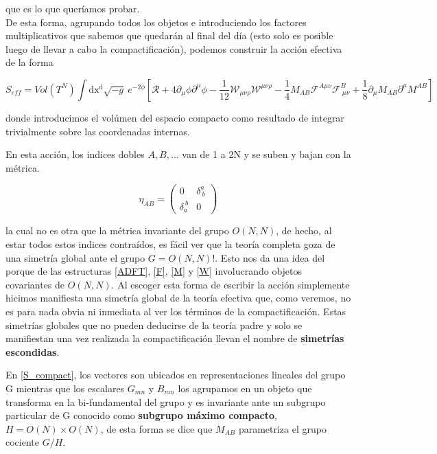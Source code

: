 \documentclass{article}
\numberwithin{equation}{section}
\begin{document}
que es lo que queríamos probar.\\


De esta forma, agrupando todos los objetos e introduciendo los factores multiplicativos que sabemos que quedarán al final del día (esto solo es posible luego de llevar a cabo la compactificación), podemos construir la acción efectiva de la forma


\begin{boxquation}
	\begin{equation}\label{S_compact}
	S_{eff}= Vol(T^N) \int\mathrm{dx^d} \sqrt{-g} \ e^{-2\phi}\left[ \mathcal{R} + 4 \partial_{\mu}\phi\partial^{\mu} \phi - \frac{1}{12} \mathcal{W}_{\mu \nu \rho} \mathcal{W}^{\mu \nu \rho} -\frac{1}{4} M_{A B} \mathcal{F}^{A \mu \nu} \mathcal{F}^B_{\ \mu \nu} + \frac{1}{8} \partial_{\mu} M_{A B} \partial^{\mu} M^{A B}\right] 
	\end{equation}
\end{boxquation}


donde introducimos el volúmen del espacio compacto como resultado de integrar trivialmente sobre las coordenadas internas.

En esta acción, los indices dobles $ A,B,... $ van de 1 a 2N y se suben y bajan con la métrica.

\begin{equation}\label{eta}
\eta_{A B} = \begin{pmatrix}
0 & \delta^a_{\ b}\\
\delta_a^{\ b} & 0
\end{pmatrix}
\end{equation}

la cual no es otra que la métrica invariante del grupo $ O(N,N) $, de hecho, al estar todos estos indices contraídos, es fácil ver que la teoría completa goza de una simetría global ante el grupo $ G= O(N,N) $!. Esto nos da una idea del porque de las estructuras \ref{ADFT}, \ref{F}, \ref{M} y \ref{W} involucrando objetos covariantes de $ O(N,N) $. Al escoger esta forma de escribir la acción simplemente hicimos manifiesta una simetría global de la teoría efectiva que, como veremos, no es para nada obvia ni inmediata al ver los términos de la compactificación. Estas simetrías globales que no pueden deducirse de la teoría padre y solo se manifiestan una vez realizada la compactificación llevan el nombre de \textbf{simetrías escondidas}.

En \ref{S_compact}, los vectores son ubicados en representaciones lineales del grupo G mientras que los escalares $ G_{m n} $ y $ B_{m n} $ los agrupamos en un objeto que transforma en la bi-fundamental del grupo y es invariante ante un subgrupo particular de G conocido como \textbf{subgrupo máximo compacto}, $ H= O(N) \times O(N) $, de esta forma se dice que $ M_{A B} $ parametriza el grupo cociente $ G/H $.\\
\end{document}
